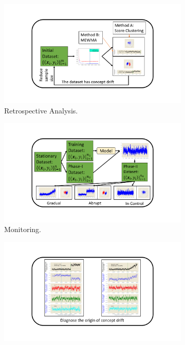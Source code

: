 \documentclass[twoside,11pt]{article}
\begin{document}
\begin{figure}[!htbp]
\centering
 \begin{subfigure}[t]{0.49\linewidth}
         \centering
         \includegraphics[width = 1\linewidth, trim=1.55in .85in 1.55in .85in, clip]{../figures/v14/flow_chart/Retrospective.png}
         \caption{Retrospective Analysis.}
         \label{fig:retro_analysis}
  \end{subfigure}
  \begin{subfigure}[t]{0.49\linewidth}
         \centering
         \includegraphics[width = 1\linewidth, trim=1.55in .85in 1.55in .85in, clip]{../figures/v14/flow_chart/Monitoring.png}
         \caption{Monitoring.}
         \label{fig:Monitoring}
  \end{subfigure}
  \begin{subfigure}[t]{0.49\linewidth}
         \centering
         \includegraphics[width = 1\linewidth, trim=1.55in .85in 1.55in .85in, clip]{../figures/v14/flow_chart/Diagnose.png}

\end{subfigure}
\end{figure}
\end{document}
